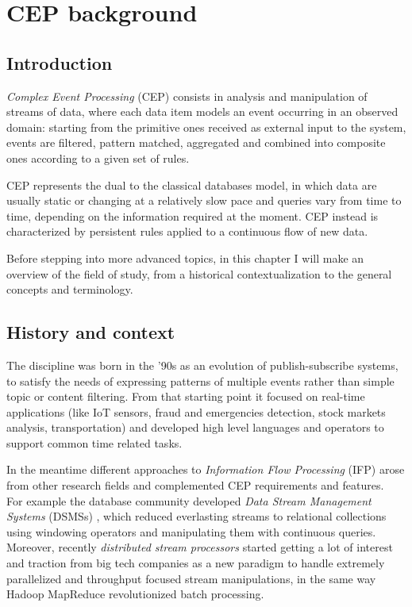 \chapter{CEP background}

\section{Introduction}
\emph{Complex Event Processing} (CEP) \cite{cep-book} consists in analysis and manipulation of streams of data, where each data item models an event occurring in an observed domain: starting from the primitive ones received as external input to the system, events are filtered, pattern matched, aggregated and combined into composite ones according to a given set of rules.

CEP represents the dual to the classical databases model, in which data are usually static or changing at a relatively slow pace and queries vary from time to time, depending on the information required at the moment. CEP instead is characterized by persistent rules applied to a continuous flow of new data.

Before stepping into more advanced topics, in this chapter I will make an overview of the field of study, from a historical contextualization to the general concepts and terminology.

\section{History and context}
The discipline was born in the '90s as an evolution of publish-subscribe systems, to satisfy the needs of expressing patterns of multiple events rather than simple topic or content filtering. From that starting point it focused on real-time applications (like IoT sensors, fraud and emergencies detection, stock markets analysis, transportation) and developed high level languages and operators to support common time related tasks.


In the meantime different approaches to \emph{Information Flow Processing} (IFP) \cite{ifp-survey} arose from other research fields and complemented CEP requirements and features.\\
For example the database community developed \emph{Data Stream Management Systems} (DSMSs) \cite{dsms}, which reduced everlasting streams to relational collections using windowing operators and manipulating them with continuous queries.\\
Moreover, recently \emph{distributed stream processors} started getting a lot of interest and traction from big tech companies as a new paradigm to handle extremely parallelized and throughput focused stream manipulations, in the same way Hadoop MapReduce \cite{map-reduce} revolutionized batch processing.

